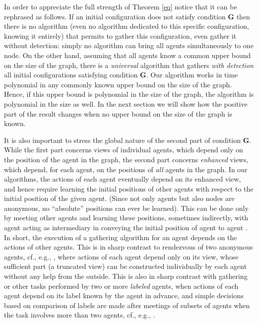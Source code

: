 \documentclass[11pt]{article}
\begin{document}
In order to appreciate the full strength of Theorem \ref{eq} notice that it can be rephrased as follows.  If  an initial configuration does not satisfy
condition {\bf G} then there is no algorithm (even no algorithm dedicated to this specific configuration, knowing it entirely) that permits to gather this configuration, even gather it without detection: simply no algorithm can bring all agents simultaneously to one node. On the other hand, assuming that all agents know a common 
upper bound on the size of the graph, there is a {\em universal} algorithm that gathers {\em with detection} all initial configurations
satisfying condition {\bf G}. Our algorithm works in time polynomial in any commonly known upper bound  on the size of the graph. Hence,  if this upper bound is
polynomial in the size of the graph, the algorithm is polynomial in the size as well. 
In the next section we will show how the positive part of the result changes when no upper bound on the size of the graph is known. 

It is also important to stress the global nature of the second part of condition {\bf G}. While the first part concerns views of individual agents, which depend only on
the position of the agent in the graph, the second part concerns {\em enhanced} views, which depend, for each agent, on the positions of {\em all} agents in the graph.
In our algorithms, the actions of each agent eventually depend on its enhanced view, and hence require learning the initial positions of other agents with respect to the initial position of the given agent.
(Since not only agents but also nodes are anonymous, no ``absolute'' positions can ever be learned).
 This can be done
only by meeting other agents and learning these positions, sometimes indirectly, with agent  acting as intermediary in conveying the initial position of agent  
to agent . In short, the execution of a gathering algorithm for an agent depends on the actions of other agents. This is in sharp contrast to rendezvous of two anonymous agents, cf., e.g., \cite{CKP}, where actions of each agent depend only on its  view, whose sufficient part (a truncated view) can be constructed
individually by each agent without any help from the outside. This is also in sharp contrast with gathering or other tasks performed by two or more {\em labeled} agents, when actions of each agent depend on its label known by the agent in advance, and simple decisions based on comparison of labels are made after meetings
of subsets of agents when the task involves more than two agents,  cf., e.g., \cite{DPV}. 
\end{document}
